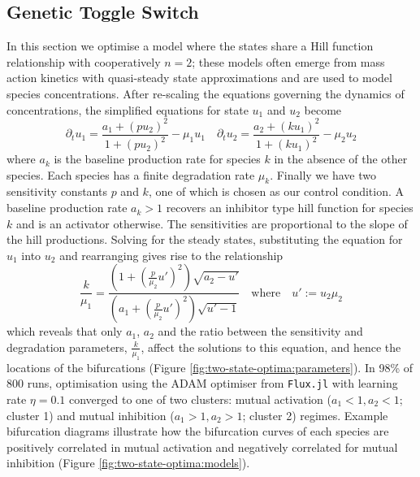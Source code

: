 \documentclass{article}
\begin{document}
\subsection{Genetic Toggle Switch}
In this section we optimise a model where the states share a Hill function relationship with cooperatively $n=2$; these models often emerge from mass action kinetics with quasi-steady state approximations and are used to model species concentrations. After re-scaling the equations governing the dynamics of concentrations, the simplified equations for state $u_1$ and $u_2$ become 
\begin{equation}
    \partial_t u_1 = \frac{ a_1 + (p u_2)^2}{ 1 + (p u_2)^2 } - \mu_1 u_1 \quad
    \partial_t u_2 = \frac{ a_2 + (k u_1)^2}{ 1 + (k u_1)^2 } - \mu_2 u_2
    \label{eq:two-state}
\end{equation}
where $a_k$ is the baseline production rate for species $k$ in the absence of the other species. Each species has a finite degradation rate $\mu_k$. Finally we have two sensitivity constants $p$ and $k$, one of which is chosen as our control condition. A baseline production rate $a_k>1$ recovers an inhibitor type hill function for species $k$ and is an activator otherwise. The sensitivities are proportional to the slope of the hill productions. Solving for the steady states,  substituting the equation for $u_1$ into $u_2$ and rearranging gives rise to the relationship
\begin{equation}
    \dfrac{k}{\mu_1} = \dfrac{(1 + (\frac{p}{\mu_2} u')^2) \sqrt{a_2 - u'} }{ (a_1 + (\frac{p}{\mu_2} u')^2) \sqrt{ u' - 1 } }
    \quad\mathrm{where}\quad u':= u_2\mu_2
    \label{eq:steady-states}
\end{equation}
which reveals that only $a_1$, $a_2$ and the ratio between the sensitivity and degradation parameters, $\frac{k}{\mu_1}$, affect the solutions to this equation, and hence the locations of the bifurcations (Figure \ref{fig:two-state-optima:parameters}). In 98\% of 800 runs, optimisation using the ADAM optimiser \cite{Kingma2014} from \texttt{Flux.jl} with learning rate $\eta=0.1$ converged to one of two clusters: mutual activation ($a_1 < 1, a_2 < 1$; cluster 1) and mutual inhibition ($a_1 > 1, a_2 > 1$; cluster 2) regimes. Example bifurcation diagrams illustrate how the bifurcation curves of each species are positively correlated in mutual activation and negatively correlated for mutual inhibition (Figure \ref{fig:two-state-optima:models}).
\end{document}
